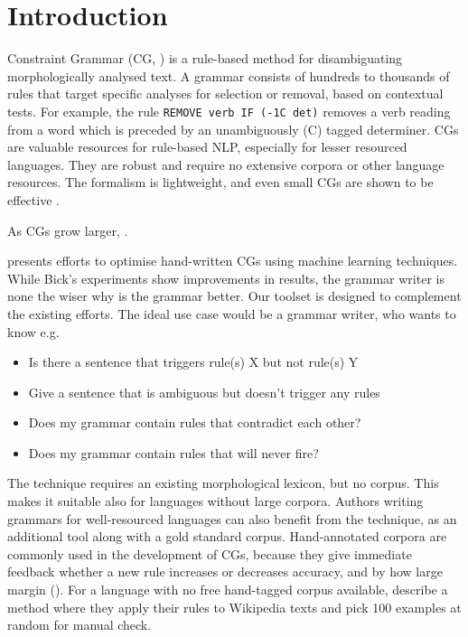 \section{Introduction}
\label{sec:intro}

Constraint Grammar (CG, \cite{karlsson1995constraint})
is a rule-based method for disambiguating morphologically analysed text. 
A grammar consists of hundreds to thousands of rules that target specific analyses for selection or removal, based on contextual tests. For example, the rule \texttt{REMOVE verb IF (-1C det)} removes a verb reading from a word which is preceded by an unambiguously (C) tagged determiner.
CGs are valuable resources for rule-based NLP, especially for lesser resourced languages. They are robust and require no extensive corpora or other language resources. The formalism is lightweight, and even small CGs are shown to be effective \cite{lene_trond2011}.

As CGs grow larger, .

\cite{bick2013tuning} presents efforts to optimise hand-written CGs using machine learning techniques.
While Bick's experiments show improvements in results, the grammar writer is none the wiser why is the grammar better.
Our toolset is designed to complement the existing efforts.
The ideal use case would be a grammar writer, who wants to know e.g.

\begin{itemize}
\item Is there a sentence that triggers rule(s) X but not rule(s) Y
\item Give a sentence that is ambiguous but doesn't trigger any rules
\item Does my grammar contain rules that contradict each other?
\item Does my grammar contain rules that will never fire?
\end{itemize}

The technique requires an existing morphological lexicon, but no corpus.
This makes it suitable also for languages without large corpora.
Authors writing grammars for well-resourced languages can also benefit from the technique, as an additional tool along with a gold standard corpus. 
Hand-annotated corpora are commonly used in the development of CGs, because they give immediate feedback whether a new rule increases or decreases accuracy, and by how large margin (\cite{voutilainen2004}). For a language with no free hand-tagged corpus available, \cite{tyers_reynolds2015} describe a method where they apply their rules to Wikipedia texts and pick 100 examples at random for manual check.

